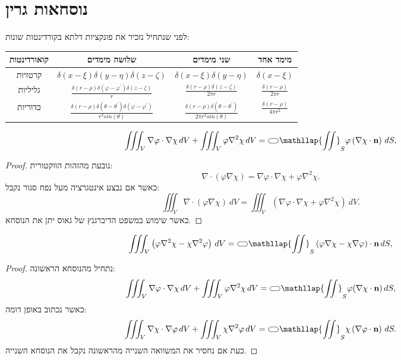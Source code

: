 \documentclass{tstextbook}
\begin{document}
\section{נוסחאות גרין}

לפני שנתחיל נזכיר את פונקציות דלתא בקורדינטות שונות:

\begin{table}[htbp]
  \centering
  \begin{tabular}{|cccc|}
    \hline
    קואורדינטות & שלושה מימדים & שני מימדים & מימד אחד \\ \hline
    קרטזיות & \(\delta(x-\xi)\delta(y-\eta)\delta(z-\zeta)\) & \(\delta(x-\xi)\delta(y-\eta)\) & \(\delta(x-\xi)\) \\ \hline
    גליליות & \(\frac{\delta(r-\rho)\delta(\varphi-\varphi^{\prime})\delta(z-\zeta)}{r}\) & \(\frac{\delta(r-\rho)\delta(z-\zeta)}{2\pi r}\) & \(\frac{\delta(r-\rho)}{2\pi r}\) \\ \hline
    כדוריות & \(\frac{\delta(r-\rho)\delta(\theta-\theta^{\prime})\delta(\varphi-\varphi^{\prime})}{r^{2}sin(\theta)}\) & \(\frac{\delta(r-\rho)\delta(\theta-\theta^{\prime})}{2\pi r^{2}sin(\theta)}\) & \(\frac{\delta(r-\rho)}{4\pi r^{2}}\) \\ \hline
  \end{tabular}
\end{table}
\begin{proposition}
$$\iiint_{V}\nabla\varphi\cdot\nabla\chi\,d V+\iiint_{V}\varphi\nabla^{2}\chi\,d V={\subset\!\supset} \mathllap{\iint}_{S}\varphi\left( \nabla\chi\cdot\mathbf{n} \right)\,d S,$$

\end{proposition}
\begin{proof}
נובעת מהזהות הווקטורית:
$$\nabla\cdot(\varphi\nabla\chi)=\nabla\varphi\cdot\nabla\chi+\varphi\nabla^{2}\chi.$$
כאשר אם נבצע אינטגרציה מעל נפח סגור נקבל:
$$\iiint_{V}\nabla\cdot(\varphi\nabla\chi)\ d V=\iiint_{V}\left(\nabla\varphi\cdot\nabla\chi+\varphi\nabla^{2}\chi\right)\ d V.$$
כאשר שימוש במשפט הדיברגנץ של גאוס יתן את הנוסחא.

\end{proof}
\begin{proposition}
$$\iiint_{V}\left(\varphi\nabla^{2}\chi-\chi\nabla^{2}\varphi\right)\,d V={\subset\!\supset} \mathllap{\iint}_{S}\left(\varphi\nabla\chi-\chi\nabla\varphi\right)\cdot\mathbf{n}\,d S,
$$

\end{proposition}
\begin{proof}
נתחיל מהנוסחא הראשונה:
$$\iiint_{V}\nabla\varphi\cdot\nabla\chi\,d V+\iiint_{V}\varphi\nabla^{2}\chi\,d V={\subset\!\supset} \mathllap{\iint}_{S}\varphi(\nabla\chi\cdot\mathbf{n})\,d S,$$
כאשר נכתוב באופן דומה:
$$\iiint_{V}\nabla\chi\cdot\nabla\varphi\,d V+\iiint_{V}\chi\nabla^{2}\varphi\,d V={\subset\!\supset} \mathllap{\iint}_{S}\chi\left( \nabla\varphi\cdot\mathbf{n} \right)\,d S.$$
כעת אם נחסיר את המשוואה השנייה מהראשונה נקבל את הנוסחא השנייה.

\end{proof}
\end{document}
